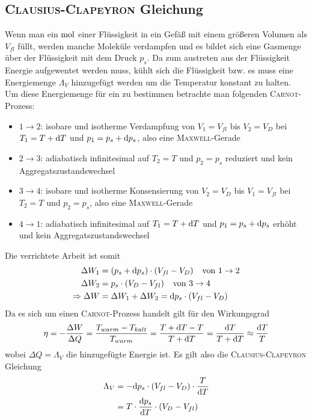 \documentclass[12pt, a4paper, twoside]{scrartcl}
\newcommand{\person}[1]{\textsc{#1}}
\begin{document}
\subsection{\person{Clausius-Clapeyron} Gleichung}
Wenn man ein $\mathrel{\textnormal{mol}}$ einer Flüssigkeit in ein Gefäß mit einem größeren Volumen als $V_{fl}$ füllt, werden manche Moleküle verdampfen und es bildet sich eine Gasmenge über der Flüssigkeit mit dem Druck $p_s$.
Da zum austreten aus der Flüssigkeit Energie aufgewentet werden muss, kühlt sich die Flüssigkeit bzw. es muss eine Energiemenge $\Lambda_V$ hinzugefügt werden um die Temperatur konstant zu halten.
\\
Um diese Energiemenge für ein zu bestimmen betrachte man folgenden \person{Carnot}-Prozess: \\
\begin{itemize}
 \item $1\rightarrow 2$: isobare und isotherme Verdampfung von $V_1=V_{fl}$ bis $V_2=V_D$ bei $T_1=T+\textnormal{d}T$ und $p_1=p_s+\textnormal{d}p_s$, also eine \person{Maxwell}-Gerade 
 \item $2\rightarrow 3$: adiabatisch infinitesimal auf $T_2=T$ und $p_2=p_s$ reduziert und kein Aggregatszustandswechsel
 \item $3\rightarrow 4$: isobare und isotherme Konsensierung von $V_2=V_D$ bis $V_1=V_{fl}$ bei $T_2=T$ und $p_2=p_s$, also eine \person{Maxwell}-Gerade
 \item $4\rightarrow 1$: adiabatisch infinitesimal auf $T_1=T+\textnormal{d}T$ und $p_1=p_s+\textnormal{d}p_s$ erhöht und kein Aggregatszustandswechsel
\end{itemize}
Die verrichtete Arbeit ist somit
\begin{align}
 \Delta W_1 &= \left(p_s+\textnormal{d}p_s\right)\cdot \left(V_{fl}-V_D\right)  \textnormal{\;\; von } 1\rightarrow 2 \nonumber\\
 \Delta W_2 &= p_s\cdot \left(V_D-V_{fl}\right) \textnormal{\;\; von } 3\rightarrow 4 \nonumber\\
 \mathrel{\Rightarrow} \Delta W &= \Delta W_1 +\Delta W_2 = \textnormal{d}p_s\cdot \left(V_{fl}-V_D\right)
\end{align}
Da es sich um einen \person{Carnot}-Prozess handelt gilt für den Wirkungsgrad
\begin{align}
 \eta = -\frac{\Delta W}{\Delta Q} = \frac{T_{warm}-T_{kalt}}{T_{warm}} = \frac{T+\textnormal{d}T-T}{T+\textnormal{d}T} = \frac{\textnormal{d}T}{T+\textnormal{d}T} \approx \frac{\textnormal{d}T}{T} \nonumber
\end{align}
wobei $\Delta Q = \Lambda_V$ die hinzugefügte Energie ist. Es gilt also die \person{Clausius-Clapeyron} Gleichung
\begin{align}
\Lambda_V &= -\textnormal{d}p_s\cdot \left(V_{fl}-V_D\right)\cdot\frac{T}{\textnormal{d}T} \nonumber\\
          &= T\cdot \frac{\textnormal{d}p_s}{\textnormal{d}T}\cdot \left(V_D-V_{fl}\right)
\end{align}
\end{document}
